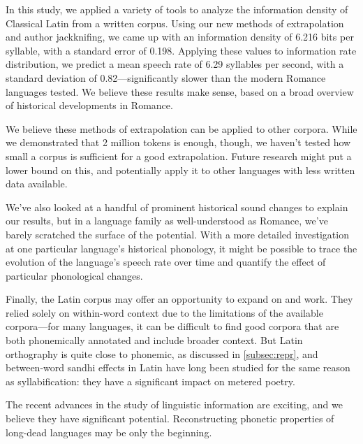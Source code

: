 \documentclass[12pt,twoside]{article}
\begin{document}
In this study, we applied a variety of tools to analyze the information density of Classical Latin from a written corpus. Using our new methods of extrapolation and author jackknifing, we came up with an information density of 6.216 bits per syllable, with a standard error of 0.198. Applying these values to  information rate distribution, we predict a mean speech rate of 6.29 syllables per second, with a standard deviation of 0.82---significantly slower than the modern Romance languages tested. We believe these results make sense, based on a broad overview of historical developments in Romance.

We believe these methods of extrapolation can be applied to other corpora. While we demonstrated that 2 million tokens is enough, though, we haven't tested how small a corpus is sufficient for a good extrapolation. Future research might put a lower bound on this, and potentially apply it to other languages with less written data available.

We've also looked at a handful of prominent historical sound changes to explain our results, but in a language family as well-understood as Romance, we've barely scratched the surface of the potential. With a more detailed investigation at one particular language's historical phonology, it might be possible to trace the evolution of the language's speech rate over time and quantify the effect of particular phonological changes.

Finally, the Latin corpus may offer an opportunity to expand on \citet{oh} and  work. They relied solely on within-word context due to the limitations of the available corpora---for many languages, it can be difficult to find good corpora that are both phonemically annotated and include broader context. But Latin orthography is quite close to phonemic, as discussed in \ref{subsec:repr}, and between-word sandhi effects in Latin have long been studied for the same reason as syllabification: they have a significant impact on metered poetry.

The recent advances in the study of linguistic information are exciting, and we believe they have significant potential. Reconstructing phonetic properties of long-dead languages may be only the beginning.

\label{sec:refs}
\setlength{} %
\printbibliography
\end{document}
